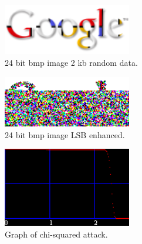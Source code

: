 \begin{figure}
	\centering
	\includegraphics[width=0.5\textwidth]{figures/google.png}
	\caption{24 bit bmp image 2 kb random data.}
	\label{fig:hiddengoodle}
\end{figure}

\begin{figure}
	\centering
	\includegraphics[width=0.5\textwidth]{figures/LSBenhanced.png}
	\caption{24 bit bmp image LSB enhanced.}
	\label{fig:LSBenhanced}
\end{figure}

\begin{figure}
	\centering
	\includegraphics[width=0.5\textwidth]{figures/ChiSquareAttack.png}
	\caption{Graph of chi-squared attack.}
	\label{fig:Chiattack}
\end{figure}
